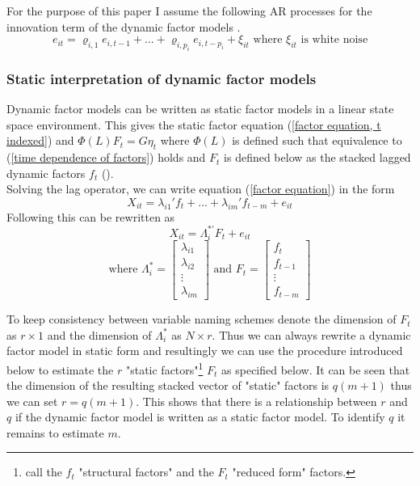 \documentclass[12pt]{article}
\begin{document}
For the purpose of this paper I assume the following AR processes for the innovation term of the dynamic factor models \citep{breitung2011testing}.
\begin{equation}
	\label{AR process innovation term}
	e_{it} = \varrho_{i,1} e_{i, t-1} + ... + \varrho_{i, p_i} e_{i, t-p_i} + \xi_{it} \text{ where $\xi_{it}$ is white noise}
\end{equation}


\subsubsection{Static interpretation of dynamic factor models}
Dynamic factor models can be written as static factor models in a linear state space environment. This gives the static factor equation (\ref{factor equation, t indexed}) and $\Phi(L) F_t = G \eta_t$ where $\Phi(L)$ is defined such that equivalence to (\ref{time dependence of factors}) holds and $F_t$ is defined below as the stacked lagged dynamic factors $f_t$ (\citet{stock2011dynamic}). \\

Solving the lag operator, we can write equation (\ref{factor equation}) in the form 
\begin{equation}
	\label{factor equation, solved lag polynomial}
	X_{it} = \lambda_{i1}' f_t + ... + \lambda_{im}' f_{t-m} + e_{it}
\end{equation}
Following \citet{bai2002determining} this can be rewritten as 
$$X_{it} = \Lambda_i^{*'} F_t + e_{it}$$
$$\text{where } \Lambda_i^* = \begin{bmatrix} \lambda_{i1} \\ \lambda_{i2} \\ \vdots \\ \lambda_{im} \end{bmatrix} \text{ and } F_t = \begin{bmatrix} f_t \\ f_{t-1} \\ \vdots \\ f_{t-m} \end{bmatrix}$$

To keep consistency between variable naming schemes denote the dimension of $F_t$ as $r \times 1$ and the dimension of $\Lambda_i^*$ as $N \times r$. Thus we can always rewrite a dynamic factor model in static form and resultingly we can use the procedure introduced below to estimate the $r$ "static factors"\footnote{\citet{breitung2004identification} call the $f_t$ "structural factors" and the $F_t$ "reduced form" factors.} $F_t$ as specified below.
It can be seen that the dimension of the resulting stacked vector of "static" factors is $q(m+1)$ thus we can set $r=q(m+1)$. This shows that there is a relationship between $r$ and $q$ if the dynamic factor model is written as a static factor model. To identify $q$ it remains to estimate $m$.
\end{document}
